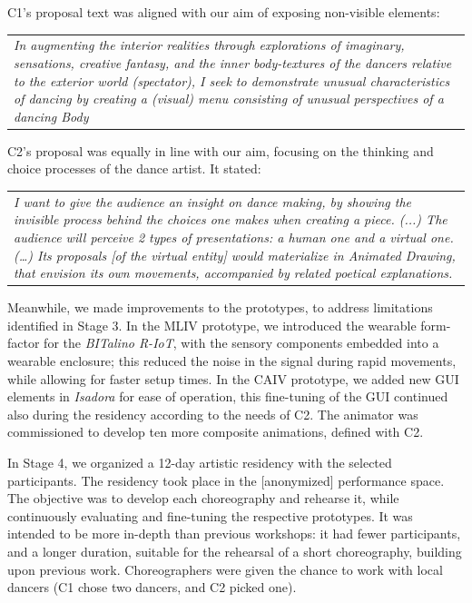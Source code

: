 C1’s proposal text was aligned with our aim of exposing non-visible elements:

\begin{center}
\begin{tabular}{ p{13cm}}
    \textit{In augmenting the interior realities through explorations of imaginary, sensations, creative fantasy, and the inner body-textures of the dancers relative to the exterior world (spectator), I seek to demonstrate unusual characteristics of dancing by creating a (visual) menu consisting of unusual perspectives of a dancing Body}
\end{tabular}
\end{center}

C2’s proposal was equally in line with our aim, focusing on the thinking and choice processes of the dance artist. It stated:

\begin{center}
\begin{tabular}{ p{13cm}}
    \textit{I want to give the audience an insight on dance making, by showing the invisible process behind the choices one makes when creating a piece. (...) The audience will perceive 2 types of presentations: a human one and a virtual one. (…) Its proposals [of the virtual entity] would materialize in Animated Drawing, that envision its own movements, accompanied by related poetical explanations.}
\end{tabular}
\end{center}

Meanwhile, we made improvements to the prototypes, to address limitations identified in Stage 3. In the MLIV prototype, we introduced the wearable form-factor for the \textit{BITalino R-IoT}, with the sensory components embedded into a wearable enclosure; this reduced the noise in the signal during rapid movements, while allowing for faster setup times. In the CAIV prototype, we added new GUI elements in \textit{Isadora} for ease of operation, this fine-tuning of the GUI continued also during the residency according to the needs of C2. The animator was commissioned to develop ten more composite animations, defined with C2.

In Stage 4, we organized a 12-day artistic residency with the selected participants. The residency took place in the [anonymized] performance space. The objective was to develop each choreography and rehearse it, while continuously evaluating and fine-tuning the respective prototypes. It was intended to be more in-depth than previous workshops: it had fewer participants, and a longer duration, suitable for the rehearsal of a short choreography, building upon previous work. Choreographers were given the chance to work with local dancers (C1 chose two dancers, and C2 picked one).

